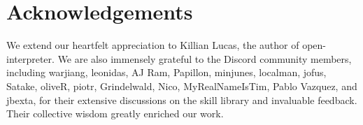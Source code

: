 \section{Acknowledgements}

We extend our heartfelt appreciation to Killian Lucas, the author of open-interpreter. We are also immensely grateful to the Discord community members, including warjiang, leonidas, AJ Ram, Papillon, minjunes, localman, jofus, Satake, oliveR, piotr, Grindelwald, Nico, MyRealNameIsTim, Pablo Vazquez, and jbexta, for their extensive discussions on the skill library and invaluable feedback. Their collective wisdom greatly enriched our work.
